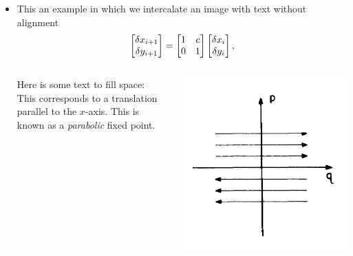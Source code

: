 \documentclass[a4,compress]{beamer}
\theoremstyle{plain}
\theoremstyle{definition}
\begin{document}

\begin{frame}
  \begin{itemize}
    \item This an example in which we intercalate an image with text without alignment
    \begin{equation*}
    \label{eq:parabolic-fixed-point}
    \begin{bmatrix}
      \var x_{i+1} \\
      \var y_{i+1}
    \end{bmatrix}
    =
    \begin{bmatrix}
      1 & c \\
      0 & 1
    \end{bmatrix}
    \begin{bmatrix}
      \var x_{i} \\
      \var y_{i}
    \end{bmatrix},
    \end{equation*}
    \begin{columns}[c]
     \begin{column}{0.5\textwidth}
       Here is some text to fill space: This corresponds to a
       translation parallel to the $x$-axis. This is known as a \emph{parabolic} fixed
       point.
     \end{column}
     \begin{column}{0.5\textwidth}
       \includegraphics[width=\textwidth]{parabolic}
     \end{column}
   \end{columns}
  \end{itemize}
\end{frame}
\end{document}
